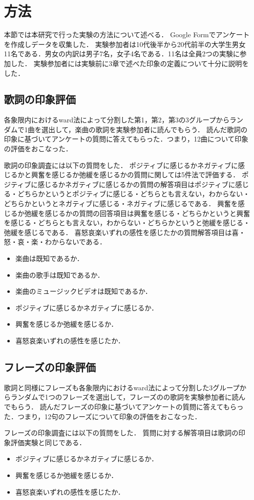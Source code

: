 \section{方法}
本節では本研究で行った実験の方法について述べる．
Google Formでアンケートを作成しデータを収集した．
実験参加者は10代後半から20代前半の大学生男女11名である．男女の内訳は男子7名，女子4名である．11名は全員2つの実験に参加した．
実験参加者には実験前に3章で述べた印象の定義について十分に説明をした．

\subsection{歌詞の印象評価}

各象限内におけるward法によって分割した第1，第2，第3の3グループからランダムで1曲を選出して，楽曲の歌詞を実験参加者に読んでもらう．
読んだ歌詞の印象に基づいてアンケートの質問に答えてもらった．つまり，12曲について印象の評価をおこなった．

歌詞の印象調査には以下の質問をした．
ポジティブに感じるかネガティブに感じるかと興奮を感じるか弛緩を感じるかの質問に関しては5件法で評価する．
ポジティブに感じるかネガティブに感じるかの質問の解答項目はポジティブに感じる・どちらかというとポジティブに感じる・どちらとも言えない，わからない・どちらかというとネガティブに感じる・ネガティブに感じるである．
興奮を感じるか弛緩を感じるかの質問の回答項目は興奮を感じる・どちらかというと興奮を感じる・どちらとも言えない，わからない・どちらかというと弛緩を感じる・弛緩を感じるである．
喜怒哀楽いずれの感性を感じたかの質問解答項目は喜・怒・哀・楽・わからないである．

\begin{itemize}
      \item 楽曲は既知であるか．
      \item 楽曲の歌手は既知であるか．
      \item 楽曲のミュージックビデオは既知であるか．
      \item ポジティブに感じるかネガティブに感じるか．
      \item 興奮を感じるか弛緩を感じるか．
      \item 喜怒哀楽いずれの感性を感じたか．
\end{itemize}

\subsection{フレーズの印象評価}
歌詞と同様にフレーズも各象限内におけるward法によって分割した3グループからランダムで1つのフレーズを選出して，フレーズのの歌詞を実験参加者に読んでもらう．
読んだフレーズの印象に基づいてアンケートの質問に答えてもらった．つまり，12句のフレーズについて印象の評価をおこなった．

フレーズの印象調査には以下の質問をした．
質問に対する解答項目は歌詞の印象評価実験と同じである．
\begin{itemize}
      \item ポジティブに感じるかネガティブに感じるか．
      \item 興奮を感じるか弛緩を感じるか．
      \item 喜怒哀楽いずれの感性を感じたか．
\end{itemize}